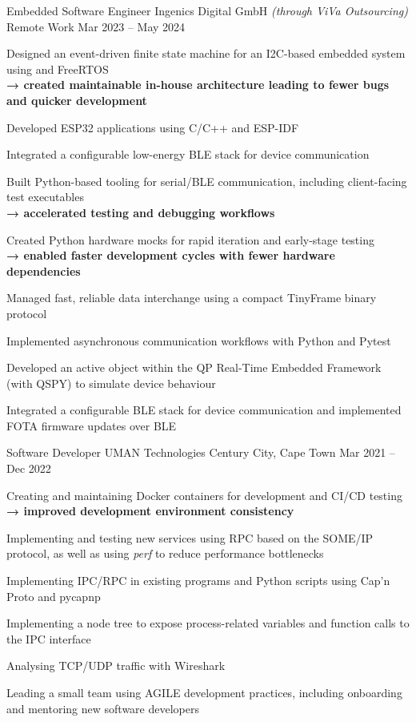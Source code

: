 \begin{cventries}
  \cventry
  {Embedded Software Engineer}
  {Ingenics Digital GmbH \emph{(through ViVa Outsourcing)}}
  {Remote Work}
  {Mar 2023 -- May 2024}
  {  
    \begin{cvitems}  
      \item Designed an event-driven finite state machine for an I2C-based embedded system using \cpp{} and FreeRTOS \\ \textbf{→ created maintainable in-house architecture leading to fewer bugs and quicker development}
      \item Developed ESP32 applications using C/C++ and ESP-IDF
      \item Integrated a configurable low-energy BLE stack for device communication
      \item Built Python-based tooling for serial/BLE communication, including client-facing test executables \\ \textbf{→ accelerated testing and debugging workflows}
      \item Created Python hardware mocks for rapid iteration and early-stage testing \\ \textbf{→ enabled faster development cycles with fewer hardware dependencies}
      \item Managed fast, reliable data interchange using a compact TinyFrame binary protocol
      \item Implemented asynchronous communication workflows with Python and Pytest
      \item Developed an active object within the QP Real-Time Embedded Framework (with QSPY) to simulate device behaviour
      \item Integrated a configurable BLE stack for device communication and implemented FOTA firmware updates over BLE
    \end{cvitems}
  }
  
  \cventry
  {Software Developer}
  {UMAN Technologies}
  {Century City, Cape Town}
  {Mar 2021 -- Dec 2022}
  {  
    \begin{cvitems}  
      \item Creating and maintaining Docker containers for development and CI/CD testing \\ \textbf{→ improved development environment consistency}
      \item Implementing and testing new services using RPC based on the SOME/IP protocol, as well as using \emph{perf} to reduce performance bottlenecks
      \item Implementing IPC/RPC in existing \cpp programs and Python scripts using Cap'n Proto and pycapnp
      \item Implementing a node tree to expose process-related variables and function calls to the IPC interface
      \item Analysing TCP/UDP traffic with Wireshark
      \item Leading a small team using AGILE development practices, including onboarding and mentoring new software developers
    \end{cvitems}
  }
  

\end{cventries}
